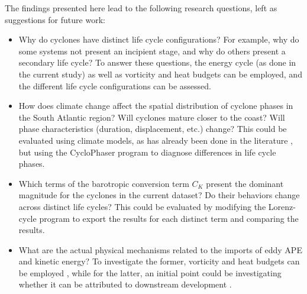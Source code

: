 The findings presented here lead to the following research questions, left as suggestions for future work:

\begin{itemize}
    \item Why do cyclones have distinct life cycle configurations? For example, why do some systems not present an incipient stage, and why do others present a secondary life cycle? To answer these questions, the energy cycle (as done in the current study) as well as vorticity and heat budgets \citep[e.g.]{dutra2017structure} can be employed, and the different life cycle configurations can be assessed.
    \item How does climate change affect the spatial distribution of cyclone phases in the South Atlantic region? Will cyclones mature closer to the coast? Will phase characteristics (duration, displacement, etc.) change? This could be evaluated using climate models, as has already been done in the literature \citep[e.g.]{reboita2018extratropical,de2022future}, but using the CycloPhaser program to diagnose differences in life cycle phases.
    \item Which terms of the barotropic conversion term $C_K$ present the dominant magnitude for the cyclones in the current dataset? Do their behaviors change across distinct life cycles? This could be evaluated by modifying the Lorenz-cycle program to export the results for each distinct term and comparing the results.
    \item What are the actual physical mechanisms related to the imports of eddy APE and kinetic energy? To investigate the former, vorticity and heat budgets can be employed \citep[e.g.]{dutra2017structure}, while for the latter, an initial point could be investigating whether it can be attributed to downstream development \citep[e.g.]{piva2010energetics}.
\end{itemize}
